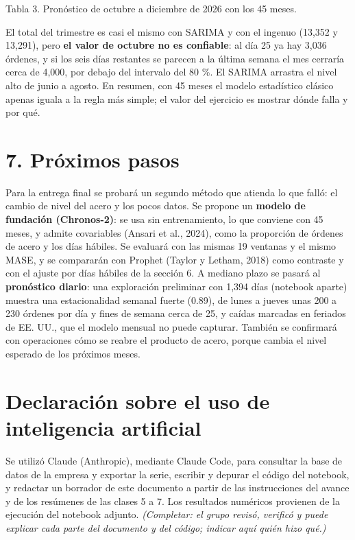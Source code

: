 \documentclass[
  spanish,
  11pt,
]{article}
\begin{document}
Tabla 3. Pronóstico de octubre a diciembre de 2026 con los 45 meses.

El total del trimestre es casi el mismo con SARIMA y con el ingenuo
(13,352 y 13,291), pero \textbf{el valor de octubre no es confiable}: al
día 25 ya hay 3,036 órdenes, y si los seis días restantes se parecen a
la última semana el mes cerraría cerca de 4,000, por debajo del
intervalo del 80 \%. El SARIMA arrastra el nivel alto de junio a agosto.
En resumen, con 45 meses el modelo estadístico clásico apenas iguala a
la regla más simple; el valor del ejercicio es mostrar dónde falla y por
qué.

\section{7. Próximos pasos}\label{pruxf3ximos-pasos}

Para la entrega final se probará un segundo método que atienda lo que
falló: el cambio de nivel del acero y los pocos datos. Se propone un
\textbf{modelo de fundación (Chronos-2)}: se usa sin entrenamiento, lo
que conviene con 45 meses, y admite covariables (Ansari et al., 2024),
como la proporción de órdenes de acero y los días hábiles. Se evaluará
con las mismas 19 ventanas y el mismo MASE, y se compararán con Prophet
(Taylor y Letham, 2018) como contraste y con el ajuste por días hábiles
de la sección 6. A mediano plazo se pasará al \textbf{pronóstico
diario}: una exploración preliminar con 1,394 días (notebook aparte)
muestra una estacionalidad semanal fuerte (0.89), de lunes a jueves unas
200 a 230 órdenes por día y fines de semana cerca de 25, y caídas
marcadas en feriados de EE. UU., que el modelo mensual no puede
capturar. También se confirmará con operaciones cómo se reabre el
producto de acero, porque cambia el nivel esperado de los próximos
meses.

\section{Declaración sobre el uso de inteligencia
artificial}\label{declaraciuxf3n-sobre-el-uso-de-inteligencia-artificial}

Se utilizó Claude (Anthropic), mediante Claude Code, para consultar la
base de datos de la empresa y exportar la serie, escribir y depurar el
código del notebook, y redactar un borrador de este documento a partir
de las instrucciones del avance y de los resúmenes de las clases 5 a 7.
Los resultados numéricos provienen de la ejecución del notebook adjunto.
\emph{(Completar: el grupo revisó, verificó y puede explicar cada parte
del documento y del código; indicar aquí quién hizo qué.)}
\end{document}
